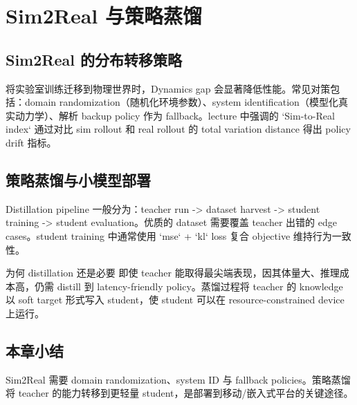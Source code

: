 \section{Sim2Real 与策略蒸馏}

\subsection{Sim2Real 的分布转移策略}

将实验室训练迁移到物理世界时，Dynamics gap 会显著降低性能。常见对策包括：domain randomization（随机化环境参数）、system identification（模型化真实动力学）、解析 backup policy 作为 fallback。lecture 中强调的 `Sim-to-Real index` 通过对比 sim rollout 和 real rollout 的 total variation distance 得出 policy drift 指标。

\subsection{策略蒸馏与小模型部署}

Distillation pipeline 一般分为：teacher run -> dataset harvest -> student training -> student evaluation。优质的 dataset 需要覆盖 teacher 出错的 edge cases。student training 中通常使用 `mse` + `kl` loss 复合 objective 维持行为一致性。

\begin{knowledgebox}{为何 distillation 还是必要}
即使 teacher 能取得最尖端表现，因其体量大、推理成本高，仍需 distill 到 latency-friendly policy。蒸馏过程将 teacher 的 knowledge 以 soft target 形式写入 student，使 student 可以在 resource-constrained device 上运行。
\end{knowledgebox}

\subsection{本章小结}

Sim2Real 需要 domain randomization、system ID 与 fallback policies。策略蒸馏将 teacher 的能力转移到更轻量 student，是部署到移动/嵌入式平台的关键途径。


